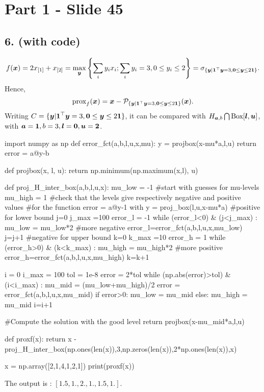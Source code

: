 \section{Part 1 - Slide 45}
%
\subsection{6. (with code)}
%
\begin{equation*}
    f(\boldsymbol x) = 2 x_{[1]} + x_{[2]} 
    = \max_{\boldsymbol y} \left\{ \sum_{i} y_i x_i; \sum_i y_i=3, 0 \le
    y_i \le 2 \right\} = \sigma_{\{ \boldsymbol y|\boldsymbol 1^\top \boldsymbol y = 3, 
    \boldsymbol 0 \le \boldsymbol y \le 2 \boldsymbol 1 \}}.
\end{equation*}
%
Hence,
%
\begin{equation*}
    \operatorname{prox}_f(\boldsymbol x) = \boldsymbol x - \mathcal P_{\{ \boldsymbol y|\boldsymbol 1^\top \boldsymbol y = 3, 
    \boldsymbol 0 \le \boldsymbol y \le 2 \boldsymbol 1 \}} (\boldsymbol x).
\end{equation*}
%
Writing $C=\{ \boldsymbol y|\boldsymbol 1^\top \boldsymbol y = 3, 
\boldsymbol 0 \le \boldsymbol y \le 2 \boldsymbol 1 \}$, it can be compared with 
$H_{\boldsymbol a, b} \bigcap \text{Box}[\boldsymbol l, \boldsymbol u]$, with 
$\boldsymbol a=\boldsymbol 1, b=3, \boldsymbol l=\boldsymbol 0, \boldsymbol u = \boldsymbol 2$.
%
\begin{python}
import numpy as np
def error_fct(a,b,l,u,x,mu):
    y = projbox(x-mu*a,l,u)
    return error = a@y-b
     
def projbox(x, l, u):
    return np.minimum(np.maximum(x,l), u)

def proj_H_inter_box(a,b,l,u,x):
    mu_low = -1 #start with guesses for mu-levels
    mu_high = 1
    #check that the levels give respectively negative and positive values
    #for the function error = a@y-1 with y = proj_box(l,u,x-mu*a)
    #positive for lower bound
    j=0
    j_max =100
    error_l = -1
    while (error_l<0) & (j<j_max) :
        mu_low = mu_low*2 #more negative
        error_l=error_fct(a,b,l,u,x,mu_low)
        j=j+1
    #negative for upper bound
    k=0
    k_max =10
    error_h = 1
    while (error_h>0) & (k<k_max) :
        mu_high = mu_high*2 #more positive 
        error_h=error_fct(a,b,l,u,x,mu_high)
        k=k+1

    i = 0
    i_max = 100
    tol = 1e-8
    error = 2*tol
    while (np.abs(error)>tol) & (i<i_max) :
        mu_mid = (mu_low+mu_high)/2
        error = error_fct(a,b,l,u,x,mu_mid)
        if error>0:
            mu_low = mu_mid
        else:
            mu_high = mu_mid
        i=i+1

    #Compute the solution with the good level
    return projbox(x-mu_mid*a,l,u)

def proxf(x):
    return x - proj_H_inter_box(np.ones(len(x)),3,np.zeros(len(x)),2*np.ones(len(x)),x)

x = np.array([2,1,4,1,2,1])
print(proxf(x))
\end{python}
%
The output is : $[1.5, 1., 2.,  1.,  1.5, 1. ]$.
%
